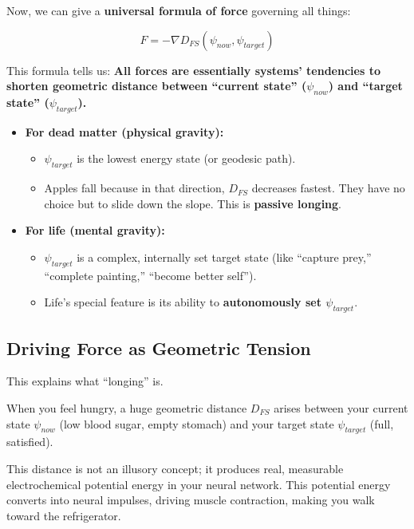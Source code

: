 \documentclass[11pt,a4paper,twoside]{book}
\begin{document}
Now, we can give a \textbf{universal formula of force} governing all things:

$$F = - \nabla D_{FS}(\psi_{now}, \psi_{target})$$

This formula tells us: \textbf{All forces are essentially systems' tendencies to shorten geometric distance between ``current state'' ($\psi_{now}$) and ``target state'' ($\psi_{target}$).}

\begin{itemize}
\item \textbf{For dead matter (physical gravity):}

    \begin{itemize}
    \item $\psi_{target}$ is the lowest energy state (or geodesic path).

    \item Apples fall because in that direction, $D_{FS}$ decreases fastest. They have no choice but to slide down the slope. This is \textbf{passive longing}.
    \end{itemize}

\item \textbf{For life (mental gravity):}

    \begin{itemize}
    \item $\psi_{target}$ is a complex, internally set target state (like ``capture prey,'' ``complete painting,'' ``become better self'').

    \item Life's special feature is its ability to \textbf{autonomously set $\psi_{target}$}.
    \end{itemize}
\end{itemize}

\subsection{Driving Force as Geometric Tension}

This explains what ``longing'' is.

When you feel hungry, a huge geometric distance $D_{FS}$ arises between your current state $\psi_{now}$ (low blood sugar, empty stomach) and your target state $\psi_{target}$ (full, satisfied).

This distance is not an illusory concept; it produces real, measurable electrochemical potential energy in your neural network. This potential energy converts into neural impulses, driving muscle contraction, making you walk toward the refrigerator.
\end{document}
